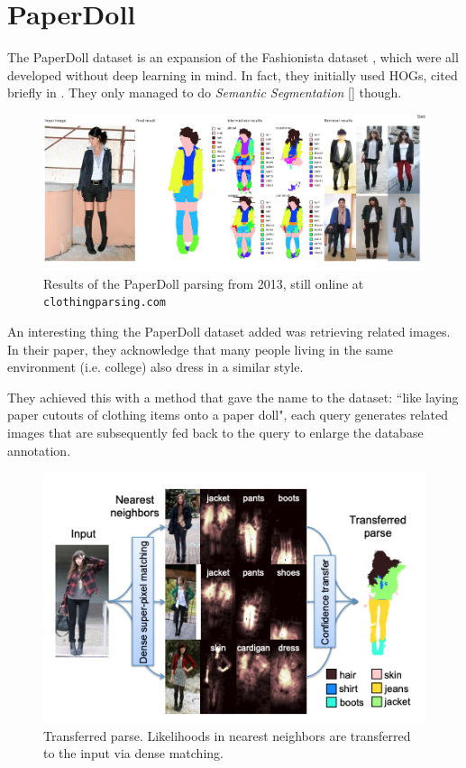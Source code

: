 \section{PaperDoll}\label{s:ds-paperdoll}

The PaperDoll dataset \cite{yamaguchi2013paper} is an expansion of the Fashionista dataset \cite{yamaguchi2012parsing}, which were all developed without deep learning in mind. In fact, they initially used HOGs, cited briefly in . They only managed to do \emph{Semantic Segmentation} [] though.

\begin{figure}[H]
	\centering
	\includegraphics[width=\linewidth]{images/paperdollparsing}
	\caption{Results of the PaperDoll parsing from 2013, still online at \texttt{clothingparsing.com}}
	\label{f:paperdollparsing}
\end{figure}

An interesting thing the PaperDoll dataset added was retrieving related images. In their paper, they acknowledge that many people living in the same environment (i.e. college) also dress in a similar style.

They achieved this with a method that gave the name to the dataset: 
“like laying paper cutouts of clothing items onto a paper doll", each query generates related images that are subsequently fed back to the query to enlarge the database annotation.

\begin{figure}[H]
	\centering
	\includegraphics[width=.75\linewidth]{images/paperdolltransfer}
	\caption{Transferred parse. Likelihoods in nearest neighbors are transferred to the input via dense matching.}
	\label{f:paperdolltransfer}
\end{figure}

